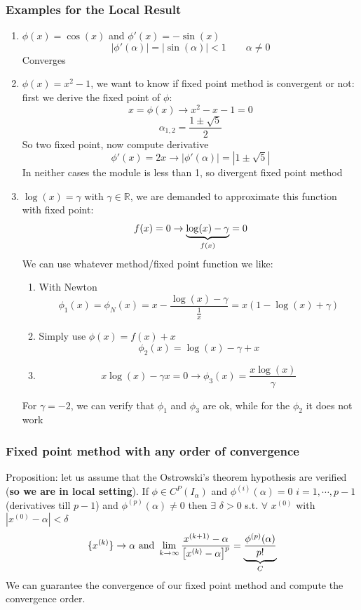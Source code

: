 \subsubsection{Examples for the Local Result}
\begin{enumerate}
    \item $\phi(x)=\cos(x)$ and $\phi'(x)=-\sin(x)$
    $$|\phi'(\alpha)|=|\sin(\alpha)|<1\qquad \alpha\neq 0$$
    Converges
    \item $\phi(x)=x^2-1$, we want to know if fixed point method is convergent or not: first we derive the fixed point of $\phi$:
    $$x=\phi(x)\rightarrow x^2-x-1=0$$
    $$\alpha_{1,2}=\frac{1\pm\sqrt{5}}{2}$$
    So two fixed point, now compute derivative
    $$\phi'(x)=2x\rightarrow|\phi'(\alpha)|=\left|1\pm\sqrt{5}\right|$$
    In neither cases the module is less than 1, so divergent fixed point method
    \item $\log(x)=\gamma$ with $\gamma\in\mathbb{R}$, we are demanded to approximate this function with fixed point:
    $$f(x)=0\rightarrow \underlabel{\log(x)-\gamma}{$f(x)$}=0$$
    We can use whatever method/fixed point function we like:
    \begin{enumerate}
        \item With Newton
        $$\phi_1(x)=\phi_N(x)=x-\frac{\log(x)-\gamma}{\frac{1}{x}}=x(1-\log(x)+\gamma)$$
        \item Simply use $\phi(x)=f(x)+x$
        $$\phi_2(x)=\log(x)-\gamma+x$$
        \item 
        $$x\log(x)-\gamma x=0\rightarrow\phi_3(x)=\frac{x\log(x)}{\gamma}$$
    \end{enumerate}
    For $\gamma=-2$, we can verify that $\phi_1$ and $\phi_3$ are ok, while for the $\phi_2$ it does not work
\end{enumerate}

\subsubsection{Fixed point method with any order of convergence}
Proposition: let us assume that the Ostrowski's theorem hypothesis are verified (\textbf{so we are in local setting}). If $\phi\in C^P(I_\alpha)$ and $\phi^{(i)}(\alpha)=0\,\,i=1,\cdots,p-1$ (derivatives till $p-1$) and $\phi^{(p)}(\alpha)\neq 0$ then $\exists\,\,\delta>0$ s.t. $\forall\,\,x^{(0)}$ with $\left|x^{(0)}-\alpha\right|<\delta$
$$
\brackets{x^{(k)}}\rightarrow\alpha\text{ and }\lim_{k\rightarrow\infty}\frac{x^{(k+1)}-\alpha}{\left[x^{(k)}-\alpha\right]^p}=\underlabel{\frac{\phi^{(p)}(\alpha)}{p!}}{$C$}
$$
We can guarantee the convergence of our fixed point method and compute the convergence order.

